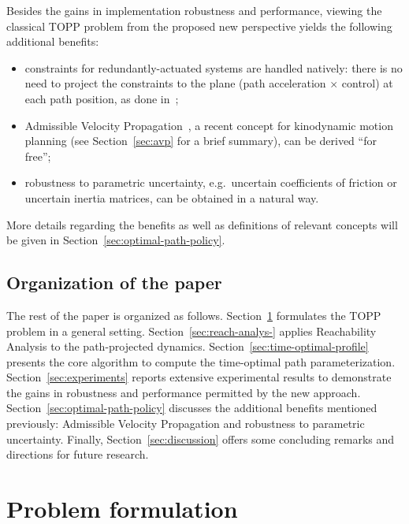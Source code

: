 \documentclass[journal]{IEEEtran}
\theoremstyle{plain}
\theoremstyle{definition}
\theoremstyle{definition}
\begin{document}
Besides the gains in implementation robustness and performance,
viewing the classical TOPP problem from the proposed new perspective
yields the following additional benefits:
\begin{itemize}
\item constraints for redundantly-actuated systems are handled
  natively: there is no need to project the constraints to the plane
  (path acceleration $\times$ control) at each path position, as done
  in~\cite{hauser2014,pham2015time};
\item Admissible Velocity Propagation~\cite{pham2017admissible}, a
  recent concept for kinodynamic motion planning (see
  Section~\ref{sec:avp} for a brief summary), can be derived ``for
  free'';
\item robustness to parametric uncertainty, e.g.\ uncertain
  coefficients of friction or uncertain inertia matrices, can be
  obtained in a natural way.
\end{itemize}
More details regarding the benefits as well as definitions of relevant
concepts will be given in Section~\ref{sec:optimal-path-policy}.

\subsection*{Organization of the paper}

The rest of the paper is organized as follows.
Section~\ref{sec:nomi-path-param} formulates the TOPP problem in a
general setting. Section~\ref{sec:reach-analys-} applies Reachability
Analysis to the path-projected
dynamics. Section~\ref{sec:time-optimal-profile} presents the core
algorithm to compute the time-optimal path
parameterization. Section~\ref{sec:experiments} reports extensive
experimental results to demonstrate the gains in robustness and
performance permitted by the new
approach. Section~\ref{sec:optimal-path-policy} discusses the
additional benefits mentioned previously: Admissible Velocity
Propagation and robustness to parametric uncertainty. Finally,
Section~\ref{sec:discussion} offers some concluding remarks and
directions for future research.

\section{Problem formulation}
\label{sec:nomi-path-param}
\end{document}
